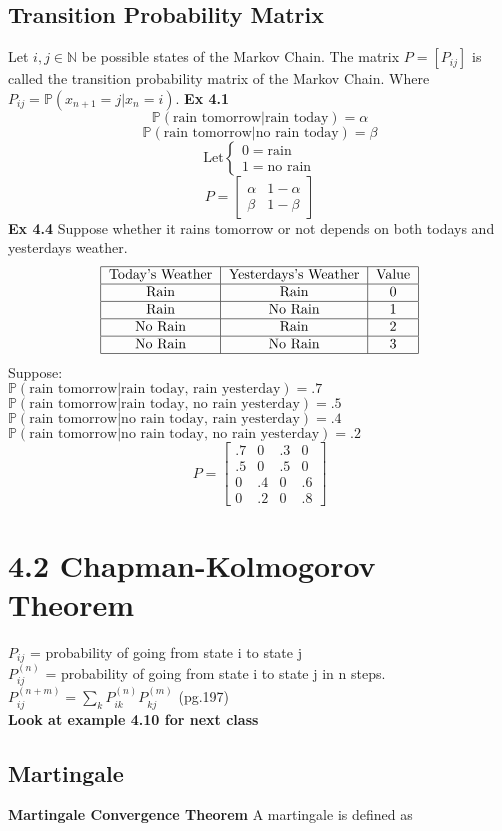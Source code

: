 \documentclass{article}
\begin{document}
\subsection*{Transition Probability Matrix}
Let $i,j \in \mathds{N}$ be possible states of the Markov Chain. The matrix $P = [P_{ij}]$ is called the transition probability matrix of the Markov Chain. Where $P_{ij} = \mathds{P}(x_{n+1} = j | x_n = i)$.
\textbf{Ex 4.1}
$$\mathds{P}(\text{rain tomorrow} | \text{rain today}) = \alpha$$
$$\mathds{P}(\text{rain tomorrow} | \text{no rain today}) = \beta$$
$$\text{Let} \begin{cases}
    0 = \text{rain} \\
    1 = \text{no rain}
\end{cases}$$
$$P = \begin{bmatrix}
    \alpha & 1 - \alpha \\
    \beta & 1 - \beta
\end{bmatrix}$$
\textbf{Ex 4.4}
Suppose whether it rains tomorrow or not depends on both todays and yesterdays weather. \\
$$\begin{tabular}{|c|c|c|}
    \hline
    Today's Weather & Yesterdays's Weather & Value \\
    \hline
    Rain & Rain & 0 \\
    \hline
    Rain & No Rain & 1 \\
    \hline
    No Rain & Rain & 2 \\
    \hline
    No Rain & No Rain & 3 \\
    \hline
\end{tabular}$$
Suppose:\\ $\mathds{P}(\text{rain tomorrow} | \text{rain today, rain yesterday}) = .7$\\
$\mathds{P}(\text{rain tomorrow} | \text{rain today, no rain yesterday}) = .5$\\
$\mathds{P}(\text{rain tomorrow} | \text{no rain today, rain yesterday}) = .4$\\
$\mathds{P}(\text{rain tomorrow} | \text{no rain today, no rain yesterday}) = .2$\\
$$P = \begin{bmatrix}
    .7 & 0 & .3 & 0 \\
    .5 & 0 & .5 & 0 \\
    0 & .4 & 0 & .6 \\
    0 & .2 & 0 & .8
\end{bmatrix}$$
\section*{4.2 Chapman-Kolmogorov Theorem}
$P_{ij}$ = probability of going from state i to state j\\
$P_{ij}^{(n)}$ = probability of going from state i to state j in n steps.\\
$P_{ij}^{(n+m)} = \sum_{k} P_{ik}^{(n)} P_{kj}^{(m)}$ (pg.197)\\
\textbf{Look at example 4.10 for next class}


\subsection*{Martingale}
\textbf{Martingale Convergence Theorem}
A martingale is defined as 
\end{document}
